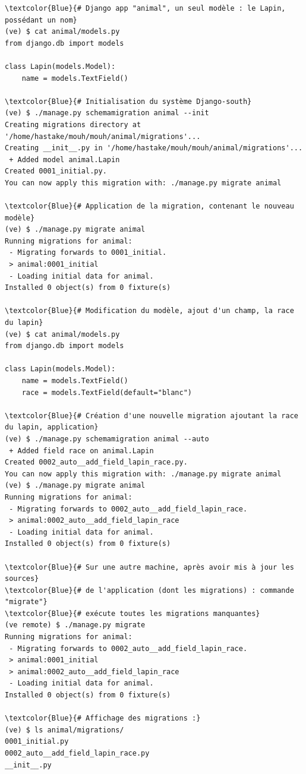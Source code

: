 \documentclass[a4paper,12pt]{article}
\begin{document}
\begin{Verbatim}
\textcolor{Blue}{# Django app "animal", un seul modèle : le Lapin, possédant un nom}
(ve) $ cat animal/models.py
from django.db import models

class Lapin(models.Model):
    name = models.TextField()

\textcolor{Blue}{# Initialisation du système Django-south}
(ve) $ ./manage.py schemamigration animal --init
Creating migrations directory at '/home/hastake/mouh/mouh/animal/migrations'...
Creating __init__.py in '/home/hastake/mouh/mouh/animal/migrations'...
 + Added model animal.Lapin
Created 0001_initial.py.
You can now apply this migration with: ./manage.py migrate animal

\textcolor{Blue}{# Application de la migration, contenant le nouveau modèle}
(ve) $ ./manage.py migrate animal
Running migrations for animal:
 - Migrating forwards to 0001_initial.
 > animal:0001_initial
 - Loading initial data for animal.
Installed 0 object(s) from 0 fixture(s)

\textcolor{Blue}{# Modification du modèle, ajout d'un champ, la race du lapin}
(ve) $ cat animal/models.py
from django.db import models

class Lapin(models.Model):
    name = models.TextField()
    race = models.TextField(default="blanc")

\textcolor{Blue}{# Création d'une nouvelle migration ajoutant la race du lapin, application}
(ve) $ ./manage.py schemamigration animal --auto
 + Added field race on animal.Lapin
Created 0002_auto__add_field_lapin_race.py.
You can now apply this migration with: ./manage.py migrate animal
(ve) $ ./manage.py migrate animal
Running migrations for animal:
 - Migrating forwards to 0002_auto__add_field_lapin_race.
 > animal:0002_auto__add_field_lapin_race
 - Loading initial data for animal.
Installed 0 object(s) from 0 fixture(s)

\textcolor{Blue}{# Sur une autre machine, après avoir mis à jour les sources}
\textcolor{Blue}{# de l'application (dont les migrations) : commande "migrate"}
\textcolor{Blue}{# exécute toutes les migrations manquantes}
(ve remote) $ ./manage.py migrate
Running migrations for animal:
 - Migrating forwards to 0002_auto__add_field_lapin_race.
 > animal:0001_initial
 > animal:0002_auto__add_field_lapin_race
 - Loading initial data for animal.
Installed 0 object(s) from 0 fixture(s)

\textcolor{Blue}{# Affichage des migrations :}
(ve) $ ls animal/migrations/
0001_initial.py
0002_auto__add_field_lapin_race.py
__init__.py
\end{Verbatim}
\end{document}

